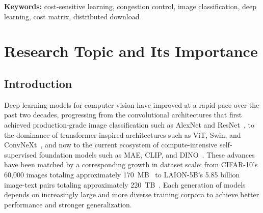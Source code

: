 \documentclass[11pt, letterpaper]{article}
\begin{document}
\vspace{12pt}
\noindent\textbf{Keywords:} cost-sensitive learning,
congestion control, image classification, deep learning,
cost matrix, distributed download

\newpage

\section{Research Topic and Its Importance}
\subsection{Introduction}
\label{sec:research_topic}
Deep learning models for computer vision have improved at a rapid pace over the past two decades, progressing from the convolutional architectures that first achieved production-grade image classification such as AlexNet and ResNet~\cite{krizhevsky2012,he2016resnet}, to the dominance of transformer-inspired architectures such as ViT, Swin, and ConvNeXt~\cite{dosovitskiy2021image, liu2021swin, liu2022convnext}, and now to the current ecosystem of compute-intensive self-supervised foundation models such as MAE, CLIP, and DINO~\cite{he2022mae, radford2021clip, darcet2025dinov3}. These advances have been matched by a corresponding growth in dataset scale: from CIFAR-10's 60{,}000 images totaling approximately 170~MB~\cite{krizhevsky2009} to LAION-5B's 5.85 billion image-text pairs totaling approximately 220~TB~\cite{schuhmann2022laion5b}. Each generation of models depends on increasingly large and more diverse training corpora to achieve better performance and stronger generalization.
\end{document}
